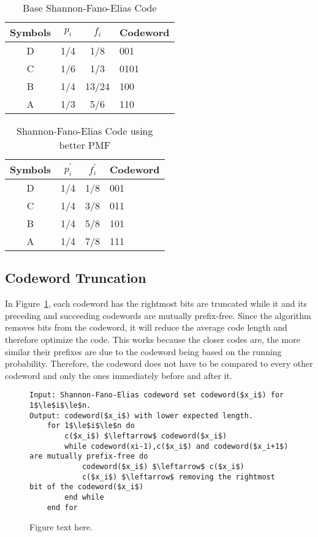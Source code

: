 \documentclass[10pt,letterpaper,notitlepage,draft]{article}
\theoremstyle{definition}
\begin{document}
\begin{table}[h]
\begin{center}
\begin{tabular}{|c|c|c|l|}
\hline
Symbols & $p_i$ & $f_i$ & Codeword \\ 
\hline 
\hline
D & 1/4 & 1/8 & 001 \\
\hline
C & 1/6 & 1/3 & 0101 \\
\hline
B & 1/4 & 13/24 & 100 \\
\hline
A & 1/3 & 5/6 & 110 \\
\hline
\end{tabular}
\end{center}
\caption{Base Shannon-Fano-Elias Code}\label{t1}
\end{table}

\begin{table}[h]
\begin{center}
\begin{tabular}{|c|c|c|l|}
\hline
Symbols & $p_i^\prime$ & $f_i^\prime$ & Codeword \\ 
\hline 
\hline
D & 1/4 & 1/8 & 001 \\
\hline
C & 1/4 & 3/8 & 011 \\
\hline
B & 1/4 & 5/8 & 101 \\
\hline
A & 1/4 & 7/8 & 111 \\
\hline
\end{tabular}
\end{center}
\caption{Shannon-Fano-Elias Code using better PMF}\label{t2}
\end{table}


\subsection{Codeword Truncation}

In Figure~\ref{f1}, each codeword has the rightmost bits are truncated while it and its preceding and succeeding codewords are mutually prefix-free. Since the algorithm removes bits from the codeword, it will reduce the average code length and therefore optimize the code. This works because the closer codes are, the more similar their prefixes are due to the codeword being based on the running probability. Therefore, the codeword does not have to be compared to every other codeword and only the ones immediately before and after it.

 \begin{figure}[h]
\caption{Figure text here.}\label{f1}
\begin{lstlisting}[breaklines]
Input: Shannon-Fano-Elias codeword set codeword($x_i$) for 1$\le$i$\le$n.
Output: codeword($x_i$) with lower expected length.
    for 1$\le$i$\le$n do
        c($x_i$) $\leftarrow$ codeword($x_i$)
        while codeword(xi-1),c($x_i$) and codeword($x_i+1$) are mutually prefix-free do
            codeword($x_i$) $\leftarrow$ c($x_i$)
            c($x_i$) $\leftarrow$ removing the rightmost bit of the codeword($x_i$)
        end while
    end for
\end{lstlisting}
\end{figure} 
\end{document}
